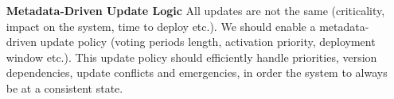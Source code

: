 \begin{itemize}
	\item[\textbf{Metadata-Driven Update Logic}] All updates are not the same
	(criticality,
	impact on the system, time to deploy etc.). We should enable a
	metadata-driven update policy (voting periods length, activation priority,
	deployment window etc.). This update policy should efficiently handle
	priorities, version dependencies, update conflicts and emergencies, in
	order the system to always be at a consistent state.
	
\end{itemize}
